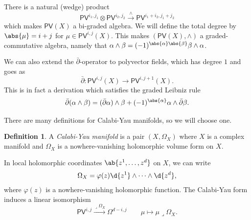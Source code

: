 \documentclass[article,10pt,oneside,oldfontcommands]{memoir}
\theoremstyle{definition}
\newtheorem{defn}[thm]{Definition}
\theoremstyle{remark}
\theoremstyle{plain}
\theoremstyle{definition}
\theoremstyle{remark}
\newcommand{\ms}[1]{\mathsf{#1}}
\newcommand{\1}{\mathbf{1}}
\newcommand{\2}{\mathbf{2}}
\newcommand{\3}{\mathbf{3}}
\newcommand{\dbar}{\bar{\partial}}
\begin{document}
There is a natural (wedge) product
\[ \ms{PV}^{i_1, j_1} \otimes \ms{PV}^{i_2, j_2} \xrightarrow{\wedge} \ms{PV}^{i_1 + i_2, j_1 + j_2} \]
which makes \(\ms{PV}(X)\) a bi-graded algebra. We will define the total degree by \(\abs{\mu} = i + j\) for \(\mu \in \ms{PV}^{i,j}(X)\). This makes \((\ms{PV}(X), \wedge)\) a graded-commutative algebra, namely that \(\alpha \wedge \beta = (-1)^{\abs{\alpha} \abs{\beta}} \beta \wedge \alpha\).

We can also extend the \(\dbar\)-operator to polyvector fields, which has degree \(1\) and goes as
\[ \dbar \colon \ms{PV}^{i,j}(X) \to \ms{PV}^{i, j+1}(X). \]
This is in fact a derivation which satisfies the graded Leibniz rule
\[ \dbar (\alpha \wedge \beta) = (\dbar \alpha) \wedge \beta + (-1)^{\abs{\alpha}} \alpha \wedge \dbar \beta. \]

There are many definitions for Calabi-Yau manifolds, so we will choose one.
\begin{defn}
    A \textit{Calabi-Yau manifold} is a pair \((X, \Omega_X)\) where \(X\) is a complex manifold and \(\Omega_X\) is a nowhere-vanishing holomorphic volume form on \(X\). 
\end{defn}

In local holomorphic coordinates \(\ab\{z^1, \ldots, z^d\}\) on \(X\), we can write
\[ \Omega_X = \varphi(z) \d{z^1} \wedge \cdots \wedge \d{z^d}, \]
where \(\varphi(z)\) is a nowhere-vanishing holomorphic function. The Calabi-Yau form induces a linear isomorphism
\[ \ms{PV}^{i,j} \xrightarrow{\lrcorner \Omega_X} \Omega^{d-i, j} \qquad \mu \mapsto \mu \lrcorner \Omega_X. \]
\end{document}
